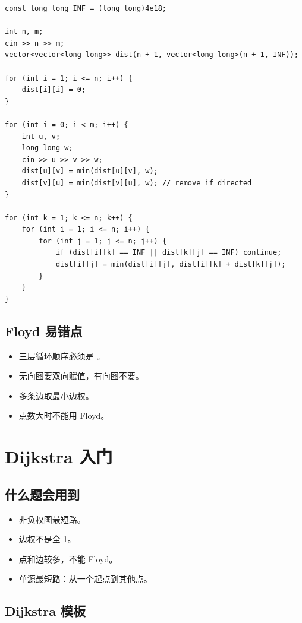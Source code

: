 \begin{lstlisting}
const long long INF = (long long)4e18;

int n, m;
cin >> n >> m;
vector<vector<long long>> dist(n + 1, vector<long long>(n + 1, INF));

for (int i = 1; i <= n; i++) {
    dist[i][i] = 0;
}

for (int i = 0; i < m; i++) {
    int u, v;
    long long w;
    cin >> u >> v >> w;
    dist[u][v] = min(dist[u][v], w);
    dist[v][u] = min(dist[v][u], w); // remove if directed
}

for (int k = 1; k <= n; k++) {
    for (int i = 1; i <= n; i++) {
        for (int j = 1; j <= n; j++) {
            if (dist[i][k] == INF || dist[k][j] == INF) continue;
            dist[i][j] = min(dist[i][j], dist[i][k] + dist[k][j]);
        }
    }
}
\end{lstlisting}

\subsection{Floyd 易错点}

\begin{itemize}
  \item 三层循环顺序必须是 。
  \item 无向图要双向赋值，有向图不要。
  \item 多条边取最小边权。
  \item 点数大时不能用 Floyd。
\end{itemize}

\section{Dijkstra 入门}\label{sec:06-21}

\subsection{什么题会用到}

\begin{itemize}
  \item 非负权图最短路。
  \item 边权不是全 1。
  \item 点和边较多，不能 Floyd。
  \item 单源最短路：从一个起点到其他点。
\end{itemize}

\subsection{Dijkstra 模板}

